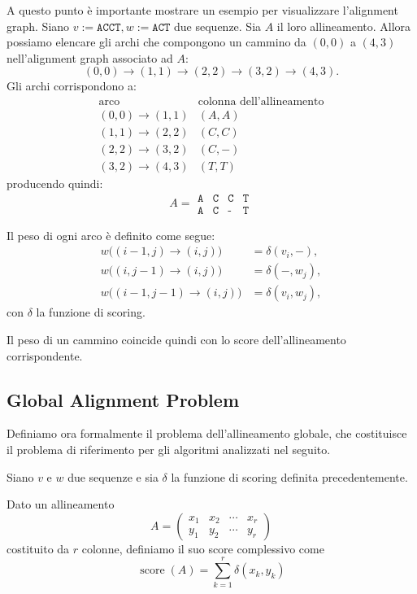 A questo punto è importante mostrare un esempio per visualizzare l'alignment graph.
Siano $v:=\texttt{ACCT},w:=\texttt{ACT}$ due sequenze. Sia $A$ il loro allineamento.
Allora possiamo elencare gli archi che compongono un cammino da $(0,0)$ a $(4,3)$ nell'alignment graph associato ad $A$:
\[
    (0,0)\to(1,1)\to(2,2)\to(3,2)\to(4,3).
\]
Gli archi corrispondono a:
\[
    \begin{array}{c|c}
        \text{arco} & \text{colonna dell'allineamento}\\
        \hline
        (0,0)\to(1,1) & (A,A)\\
        (1,1)\to(2,2) & (C,C)\\
        (2,2)\to(3,2) & (C,-)\\
        (3,2)\to(4,3) & (T,T)
    \end{array}
\]
producendo quindi:
\[
    A=
    \begin{matrix}
        \texttt{A} & \texttt{C} & \texttt{C} & \texttt{T} \\
        \texttt{A} & \texttt{C} & \texttt{-} & \texttt{T}
    \end{matrix}
\]


Il peso di ogni arco è definito come segue:
\[
    \begin{aligned}
        w\bigl((i-1,j)\to(i,j)\bigr) &=\delta(v_i,-),\\
        w\bigl((i,j-1)\to(i,j)\bigr) &=\delta(-,w_j),\\
        w\bigl((i-1,j-1)\to(i,j)\bigr) &=\delta(v_i,w_j),
    \end{aligned}
\]
con $\delta$ la funzione di scoring.

Il peso di un cammino coincide quindi con lo score dell'allineamento
corrispondente.

\subsection{Global Alignment Problem}

Definiamo ora formalmente il problema dell'allineamento globale, che
costituisce il problema di riferimento per gli algoritmi analizzati nel seguito.

Siano $v$ e $w$ due sequenze e sia $\delta$ la funzione di scoring definita precedentemente.

Dato un allineamento
\[
    A= \begin{pmatrix}
        x_{1} & x_{2} & \cdots & x_r \\
        y_{1} & y_{2} & \cdots & y_r
    \end{pmatrix}
\]
costituito da $r$ colonne, definiamo il suo score complessivo come
\[
    \operatorname{score}(A) = \sum^{r}_{k=1} \delta(x_{k},y_{k})
\]

